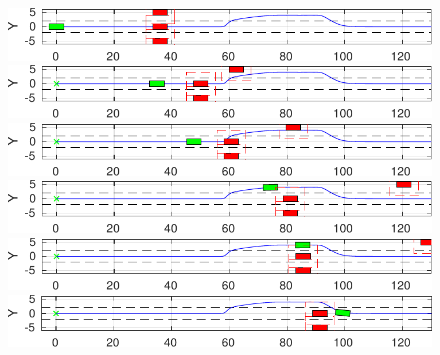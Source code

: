 \begin{figure}[!h]
	\centering
	\begin{minipage}[t]{\textwidth}
		\includegraphics[width=\textwidth]{./figure/three_obstacles_no_overtaking/braking_0.pdf}
	\end{minipage}
	\begin{minipage}[t]{\textwidth}
		\includegraphics[width=\textwidth]{./figure/three_obstacles_no_overtaking/braking_1.pdf}
	\end{minipage}
	\begin{minipage}[t]{\textwidth}
		\includegraphics[width=\textwidth]{./figure/three_obstacles_no_overtaking/braking_2.pdf}
	\end{minipage}
	\begin{minipage}[t]{\textwidth}
		\includegraphics[width=\textwidth]{./figure/three_obstacles_no_overtaking/braking_3.pdf}
	\end{minipage}
	\begin{minipage}[t]{\textwidth}
		\includegraphics[width=\textwidth]{./figure/three_obstacles_no_overtaking/braking_4.pdf}
	\end{minipage}
	\begin{minipage}[t]{\textwidth}
		\includegraphics[width=\textwidth]{./figure/three_obstacles_no_overtaking/braking_5.pdf}

\end{minipage}
\end{figure}

